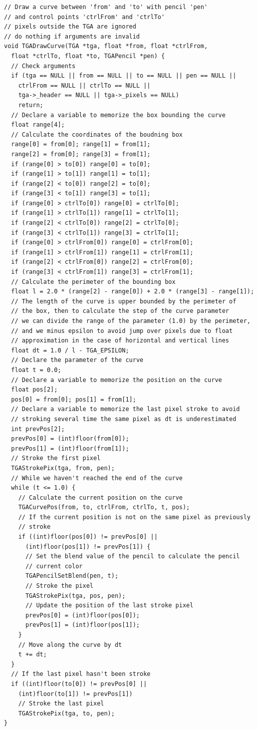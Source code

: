 \documentclass[12pt, a4paper]{article}
\begin{document}
\begin{scriptsize}
\begin{ttfamily}
\begin{lstlisting}
// Draw a curve between 'from' and 'to' with pencil 'pen'
// and control points 'ctrlFrom' and 'ctrlTo'
// pixels outside the TGA are ignored
// do nothing if arguments are invalid
void TGADrawCurve(TGA *tga, float *from, float *ctrlFrom, 
  float *ctrlTo, float *to, TGAPencil *pen) {
  // Check arguments
  if (tga == NULL || from == NULL || to == NULL || pen == NULL ||
    ctrlFrom == NULL || ctrlTo == NULL ||
    tga->_header == NULL || tga->_pixels == NULL)
    return;
  // Declare a variable to memorize the box bounding the curve
  float range[4];
  // Calculate the coordinates of the boudning box
  range[0] = from[0]; range[1] = from[1];
  range[2] = from[0]; range[3] = from[1];
  if (range[0] > to[0]) range[0] = to[0];
  if (range[1] > to[1]) range[1] = to[1];
  if (range[2] < to[0]) range[2] = to[0];
  if (range[3] < to[1]) range[3] = to[1];
  if (range[0] > ctrlTo[0]) range[0] = ctrlTo[0];
  if (range[1] > ctrlTo[1]) range[1] = ctrlTo[1];
  if (range[2] < ctrlTo[0]) range[2] = ctrlTo[0];
  if (range[3] < ctrlTo[1]) range[3] = ctrlTo[1];
  if (range[0] > ctrlFrom[0]) range[0] = ctrlFrom[0];
  if (range[1] > ctrlFrom[1]) range[1] = ctrlFrom[1];
  if (range[2] < ctrlFrom[0]) range[2] = ctrlFrom[0];
  if (range[3] < ctrlFrom[1]) range[3] = ctrlFrom[1];
  // Calculate the perimeter of the bounding box
  float l = 2.0 * (range[2] - range[0]) + 2.0 * (range[3] - range[1]);
  // The length of the curve is upper bounded by the perimeter of
  // the box, then to calculate the step of the curve parameter
  // we can divide the range of the parameter (1.0) by the perimeter,
  // and we minus epsilon to avoid jump over pixels due to float
  // approximation in the case of horizontal and vertical lines
  float dt = 1.0 / l - TGA_EPSILON;
  // Declare the parameter of the curve
  float t = 0.0;
  // Declare a variable to memorize the position on the curve
  float pos[2];
  pos[0] = from[0]; pos[1] = from[1];
  // Declare a variable to memorize the last pixel stroke to avoid
  // stroking several time the same pixel as dt is underestimated
  int prevPos[2];
  prevPos[0] = (int)floor(from[0]); 
  prevPos[1] = (int)floor(from[1]);
  // Stroke the first pixel
  TGAStrokePix(tga, from, pen);  
  // While we haven't reached the end of the curve
  while (t <= 1.0) {
    // Calculate the current position on the curve
    TGACurvePos(from, to, ctrlFrom, ctrlTo, t, pos);
    // If the current position is not on the same pixel as previously
    // stroke
    if ((int)floor(pos[0]) != prevPos[0] || 
      (int)floor(pos[1]) != prevPos[1]) {
      // Set the blend value of the pencil to calculate the pencil 
      // current color
      TGAPencilSetBlend(pen, t);
      // Stroke the pixel
      TGAStrokePix(tga, pos, pen);
      // Update the position of the last stroke pixel
      prevPos[0] = (int)floor(pos[0]); 
      prevPos[1] = (int)floor(pos[1]);
    }
    // Move along the curve by dt
    t += dt;
  }
  // If the last pixel hasn't been stroke
  if ((int)floor(to[0]) != prevPos[0] || 
    (int)floor(to[1]) != prevPos[1])
    // Stroke the last pixel
    TGAStrokePix(tga, to, pen);  
}
  

\end{lstlisting}
\end{ttfamily}
\end{scriptsize}
\end{document}
